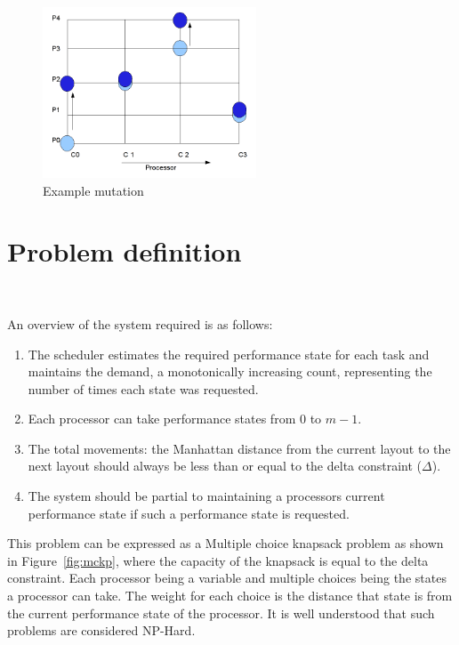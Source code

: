 \begin{figure}[h!]
  \begin{center}
    \includegraphics[height=2in]{figures/example_mutation_3.png}
    \caption{Example mutation}
    \label{fig:ex_mutation}
  \end{center}
\end{figure}

\section{Problem definition}~\label{sec:ago}

An overview of the system required is as follows:
\begin{enumerate}
\item The scheduler estimates the required performance state for each task and maintains the demand, 
a monotonically increasing count, representing the number of times each state was requested. 
\item Each processor can take performance states from $0$ to $m-1$. 
\item The total movements: the Manhattan distance from the current layout to the next layout 
should always be less than or equal to the delta constraint ($\Delta$). 
\item The system should be partial to maintaining a processors current performance state if such a performance state is requested.
\end{enumerate}

This problem can be expressed as a Multiple choice knapsack problem as shown in Figure~\ref{fig:mckp}, 
where the capacity of the knapsack 
is equal to the delta constraint. Each processor being a variable and multiple choices being the states 
a processor can take. The weight for each choice is the distance that state is from the current 
performance state of the processor. It is well understood that such problems are considered NP-Hard.


